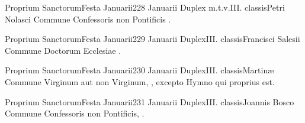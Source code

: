 \documentclass[nocturnale-romanum.tex]{subfiles}
\begin{document}
	{Proprium Sanctorum}{Festa Januarii}{2}{28 Januarii}
	{Duplex m.t.v.}{III. classis}{Petri Nolasci}
	{Commune Confessoris non Pontificis \pageref{M-CONP}.}
	{}

	{Proprium Sanctorum}{Festa Januarii}{2}{29 Januarii}
	{Duplex}{III. classis}{Francisci Salesii}
	{Commune Doctorum Ecclesiae \pageref{M-CODO}.}
	{}

	{Proprium Sanctorum}{Festa Januarii}{2}{30 Januarii}
	{Duplex}{III. classis}{Martinæ}
	{Commune Virginum aut non Virginum, \pageref{M-MU}, excepto Hymno qui proprius est.}
	{}

	{Proprium Sanctorum}{Festa Januarii}{2}{31 Januarii}
	{Duplex}{III. classis}{Joannis Bosco}
	{Commune Confessoris non Pontificis, \pageref{M-CONP}.}
	{}
\end{document}
